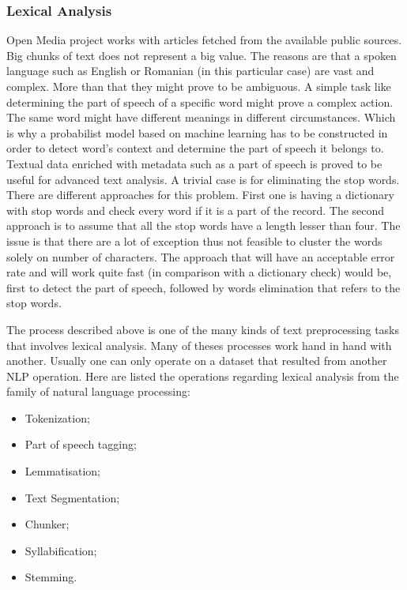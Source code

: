 \subsubsection{Lexical Analysis}
Open Media project works with articles fetched from the available public sources. Big chunks of text does not represent a big value. The reasons are that a spoken language such as English or Romanian (in this particular case) are vast and complex. More than that they might prove to be ambiguous. A simple task like determining the part of speech of a specific word might prove a complex action. The same word might have different meanings in different circumstances. Which is why a probabilist model based on machine learning has to be constructed in order to detect word's context and determine the part of speech it belongs to. Textual data enriched with metadata such as a part of speech is proved to be useful for advanced text analysis. A trivial case is for eliminating the stop words. There are different approaches for this problem. First one is having a dictionary with stop words and check every word if it is a part of the record. The second approach is to assume that all the stop words have a length lesser than four. The issue is that there are a lot of exception thus not feasible to cluster the words solely on number of characters. The approach that will have an acceptable error rate and will work quite fast (in comparison with a dictionary check) would be, first to detect the part of speech, followed by words elimination that refers to the stop words.

The process described above is one of the many kinds of text preprocessing tasks that involves lexical analysis. Many of theses processes work hand in hand with another. Usually one can only operate on a dataset that resulted from another NLP operation. Here are listed the operations regarding lexical analysis from the family of natural language processing:
\begin{itemize}
    \item Tokenization;
    \item Part of speech tagging;
    \item Lemmatisation;
    \item Text Segmentation;
    \item Chunker;
    \item Syllabification;
    \item Stemming.
\end{itemize}

